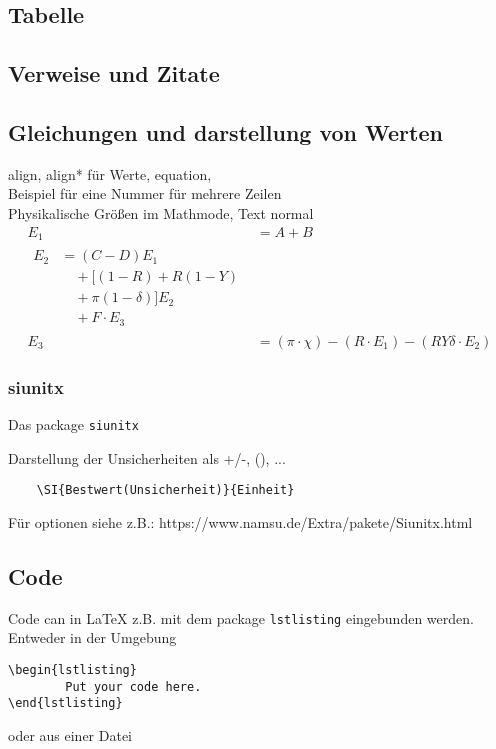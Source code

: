 \documentclass[twoside, 11pt, ngerman, a4paper, biblography=totoc]{scrartcl}
\begin{document}
\subsection{Tabelle}

\subsection{Verweise und Zitate}

\subsection{Gleichungen und darstellung von Werten}

align, align* für Werte, equation,\\
Beispiel für eine Nummer für mehrere Zeilen\\
Physikalische Größen im Mathmode, Text normal
\begin{align}
	E_1&=A+B \label{eq:1}\\
	\begin{split}
		E_2&=(C-D)E_1 \label{eq:2}\\
		&\quad +[(1-R)+R(1-Y)\\
		&\quad +\pi(1-\delta)]E_2\\
		&\quad +F\cdot E_3
	\end{split}\\
	E_3 &=(\pi\cdot \chi)-(R\cdot E_1)-(RY\delta\cdot E_2) \label{eq:3}
\end{align}

\subsubsection{siunitx}
Das package \texttt{siunitx} 

Darstellung der Unsicherheiten als +/-, (), ...
\begin{verbatim}
	\SI{Bestwert(Unsicherheit)}{Einheit}
\end{verbatim}


Für optionen siehe z.B.: https://www.namsu.de/Extra/pakete/Siunitx.html

\subsection{Code}
Code can in LaTeX z.B. mit dem package \texttt{lstlisting} eingebunden werden. Entweder in der Umgebung
\begin{verbatim}
\begin{lstlisting}
		Put your code here.
\end{lstlisting}
\end{verbatim}
oder aus einer Datei 
\begin{verbatim}
		
\end{verbatim}
\end{document}
